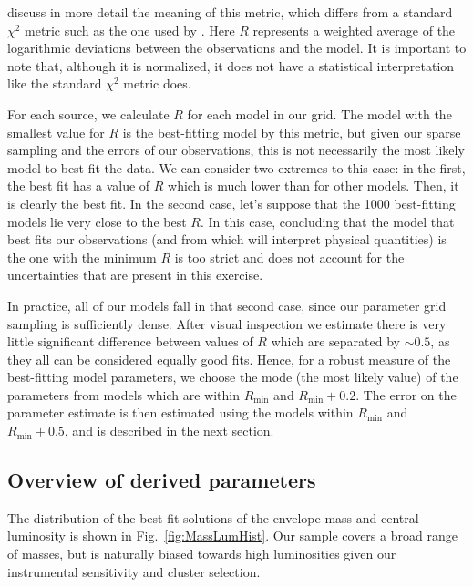 \citet{Furlan:2016df} discuss in more detail the meaning of this metric, which differs from a standard $\chi^2$ metric such as the one used by \citet{Robitaille:2007dl}. Here $R$ represents a weighted average of the logarithmic deviations between the observations and the model. It is important to note that, although it is normalized, it does not have a statistical interpretation like the standard $\chi^2$ metric does. 

For each source, we calculate $R$ for each model in our grid. The model with the smallest value for $R$ is the best-fitting model by this metric, but given our sparse sampling and the errors of our observations, this is not necessarily the most likely model to best fit the data. We can consider two extremes to this case: in the first, the best fit has a value of $R$ which is much lower than for other models. Then, it is clearly the best fit. In the second case, let's suppose that the 1000 best-fitting models lie very close to the best $R$. In this case, concluding that the model that best fits our observations (and from which will interpret physical quantities) is the one with the minimum $R$ is too strict and does not account for the uncertainties that are present in this exercise. 

In practice, all of our models fall in that second case, since our parameter grid sampling is sufficiently dense. After visual inspection we estimate there is very little significant difference between values of $R$ which are separated by $\sim 0.5$, as they all can be considered equally good fits. Hence, for a robust measure of the best-fitting model parameters, we choose the mode (the most likely value) of the parameters from models which are within $R_\textrm{min}$ and $R_\textrm{min}+0.2$. The error on the parameter estimate is then estimated using the models within $R_\textrm{min}$ and $R_\textrm{min}+0.5$, and is described in the next section.

\subsection{Overview of derived parameters}

The distribution of the best fit solutions of the envelope mass and central luminosity is shown in Fig.~\ref{fig:MassLumHist}. Our sample covers a broad range of masses, but is naturally biased towards high luminosities given our instrumental sensitivity and cluster selection.


